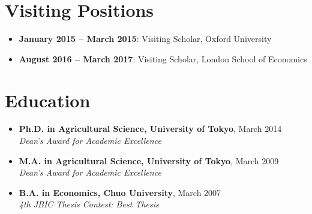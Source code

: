 \documentclass[12pt]{article}
\begin{document}
\section*{Visiting Positions}
\begin{itemize}
    \item \textbf{January 2015 -- March 2015}: Visiting Scholar, Oxford University
    \item \textbf{August 2016 -- March 2017}: Visiting Scholar, London School of Economics
\end{itemize}

\section*{Education}
\begin{itemize}
    \item \textbf{Ph.D. in Agricultural Science, University of Tokyo}, March 2014 \\
    \textit{Dean's Award for Academic Excellence}

    \item \textbf{M.A. in Agricultural Science, University of Tokyo}, March 2009 \\
    \textit{Dean's Award for Academic Excellence}

    \item \textbf{B.A. in Economics, Chuo University}, March 2007 \\
    \textit{4th JBIC Thesis Contest: Best Thesis}
\end{itemize}

\end{document}
